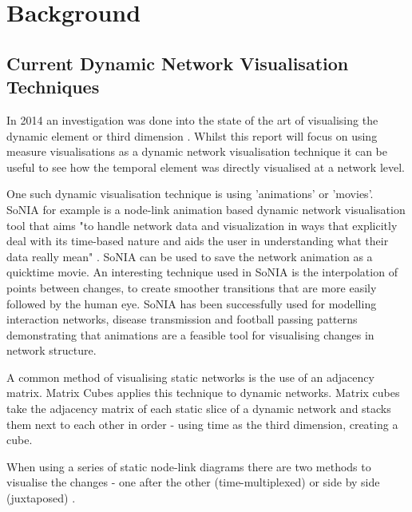 
\chapter{Background}

\section{Current Dynamic Network Visualisation Techniques}

In 2014 an investigation was done into the state of the art of visualising the dynamic element or third dimension \cite{tsotaivg}. Whilst this report will focus on using measure visualisations as a dynamic network visualisation technique it can be useful to see how the temporal element was directly visualised at a network level.

One such dynamic visualisation technique is using 'animations' or 'movies'. SoNIA \cite{sonia} for example is a node-link animation based dynamic network visualisation tool that aims "to handle network data and visualization in ways that explicitly deal with its time-based nature and aids the user in understanding what their data really mean" \cite{taasodnv}. SoNIA can be used to save the network animation as a quicktime movie. An interesting technique used in SoNIA is the interpolation of points between changes, to create smoother transitions that are more easily followed by the human eye. SoNIA has been successfully used for modelling interaction networks, disease transmission and football passing patterns demonstrating that animations are a feasible tool for visualising changes in network structure.

A common method of visualising static networks is the use of an adjacency matrix. Matrix Cubes \cite{vdnwmc} applies this technique to dynamic networks. Matrix cubes take the adjacency matrix of each static slice of a dynamic network and stacks them next to each other in order - using time as the third dimension, creating a cube. 

When using a series of static node-link diagrams there are two methods to visualise the changes - one after the other (time-multiplexed) or side by side (juxtaposed) \cite{vdnwmc}. 


